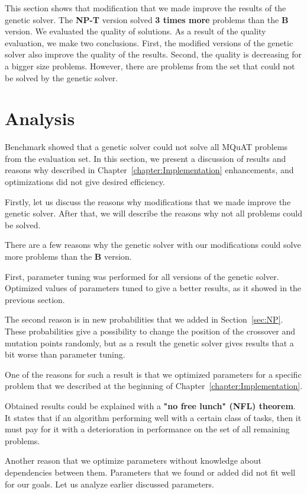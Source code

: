 This section shows that modification that we made improve the results of the genetic solver. The \textbf{NP-T} version solved \textbf{3 times more} problems than the \textbf{B} version. We evaluated the quality of solutions. As a result of the quality evaluation, we make two conclusions. First, the modified versions of the genetic solver also improve the quality of the results. Second, the quality is decreasing for a bigger size problems.
However, there are problems from the set that could not be solved by the genetic solver.


\section{Analysis}

Benchmark showed that a genetic solver could not solve all MQuAT problems from the evaluation set.
In this section, we present a discussion of results and reasons why described in Chapter~\ref{chapter:Implementation} enhancements, and optimizations did not give desired efficiency.

Firstly, let us discuss the reasons why modifications that we made improve the genetic solver. After that, we will describe the reasons why not all problems could be solved.

There are a few reasons why the genetic solver with our modifications could solve more problems than the \textbf{B} version. 

First, parameter tuning was performed for all versions of the genetic solver. Optimized values of parameters tuned to give a better results, as it showed in the previous section. 

The second reason is in new probabilities that we added in Section~\ref{sec:NP}. These probabilities give a possibility to change the position of the crossover and mutation points randomly, but as a result the genetic solver gives results that a bit worse than parameter tuning. 

One of the reasons for such a result is that we optimized parameters for a specific problem that we described at the beginning of Chapter~\ref{chapter:Implementation}.

Obtained results could be explained with a \textbf{"no free lunch" (NFL) theorem}\cite{wolpert1996, wolpert1997}. It states that if an algorithm performing well with a certain class of tasks, then it must pay for it with a deterioration in performance on the set of all remaining problems.

Another reason that we optimize parameters without knowledge about dependencies between them. Parameters that we found or added did not fit well for our goals. Let us analyze earlier discussed parameters.

